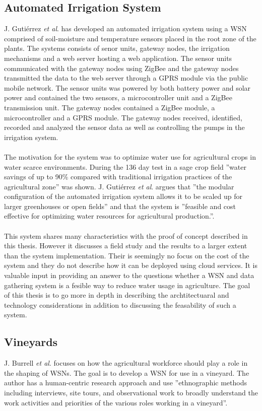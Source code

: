 \documentclass[]{uiophd}
\begin{document}
\subsection{Automated Irrigation System}
J. Gutiérrez \textit{et al}. \cite{6582678} has developed an automated irrigation system using a WSN comprised of soil-moisture and temperature sensors placed in the root zone of the plants. The systems consists of senor units, gateway nodes, the irrigation mechanisms and a web server hosting a web application. The sensor units communicated with the gateway nodes using ZigBee and the gateway nodes transmitted the data to the web server through a GPRS module via the public mobile network. The sensor units was powered by both battery power and solar power and contained the two sensors, a microcontroller unit and a ZigBee transmission unit. The gateway nodes contained a ZigBee module, a microcontroller and a GPRS module. The gateway nodes received, identified, recorded and analyzed the sensor data as well as controlling the pumps in the irrigation system.
\\\\
The motivation for the system was to optimize water use for agricultural crops in water scarce environments. During the 136 day test in a sage crop field ''water savings of up to 90\% compared with traditional irrigation practices of the agricultural zone''\cite[p.~174]{6582678} was shown. J. Gutiérrez \textit{et al}. argues that ''the modular configuration of the automated irrigation system allows it to be scaled up for larger greenhouses or open fields''\cite[p.~166]{6582678} and that the system is ''feasible and cost effective for optimizing water resources for agricultural production.''\cite[p.~174]{6582678}.
\\\\
This system shares many characteristics with the proof of concept described in this thesis. However it discusses a field study and the results to a larger extent than the system implementation. Their is seemingly no focus on the cost of the system and they do not describe how it can be deployed using cloud services. It is valuable input in providing an answer to the questions whether a WSN and data gathering system is a fesible way to reduce water usage in agriculture. The goal of this thesis is to go more in depth in describing the archtitectuaral and technology considerations in addition to discussing the feasability of such a system.  

\subsection{Vineyards}
J. Burrell \textit{et al}.\cite{1269130} focuses on how the agricultural workforce should play a role in the shaping of WSNs. The goal is to develop a WSN for use in a vineyard. The author has a human-centric research approach and use ''ethnographic methods including interviews, site tours, and observational work to broadly understand the work activities and priorities of the various roles working in a vineyard''\cite[p.~38]{1269130}.
\end{document}
